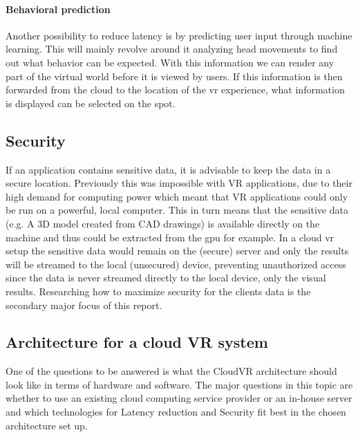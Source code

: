 \paragraph{Behavioral prediction}
Another possibility to reduce latency is by predicting
user input through machine learning. This will mainly revolve around it
analyzing head movements to find out what behavior can be expected. With
this information we can render any part of the virtual world before it
is viewed by users. If this information is then forwarded from the
cloud to the location of the \acrshort{vr} experience, what information is displayed can be selected on the spot.

\subsection{Security}
If an application contains sensitive data, it is advisable to keep the data in a secure location. Previously this was impossible with VR applications, due to their high demand for computing power which meant that VR applications could only be run on a powerful, local computer. This in turn means that the sensitive data (e.g. A 3D model created from CAD drawings) is available directly on the machine and thus could be extracted from the \acrshort{gpu} for example. In a cloud \acrshort{vr} setup the sensitive data would remain on the (secure) server and only the results will be streamed to the local (unsecured) device, preventing unauthorized access since the data is never streamed directly to the local device, only the visual results. Researching how to maximize security for the clients data is the secondary major focus of this report.

\subsection{Architecture for a cloud VR system}
One of the questions to be answered is what the CloudVR architecture should look like
in terms of hardware and software. The major questions in this topic are whether to use an existing cloud computing service provider or an in-house server and which technologies for Latency reduction and Security fit best in the chosen architecture set up.